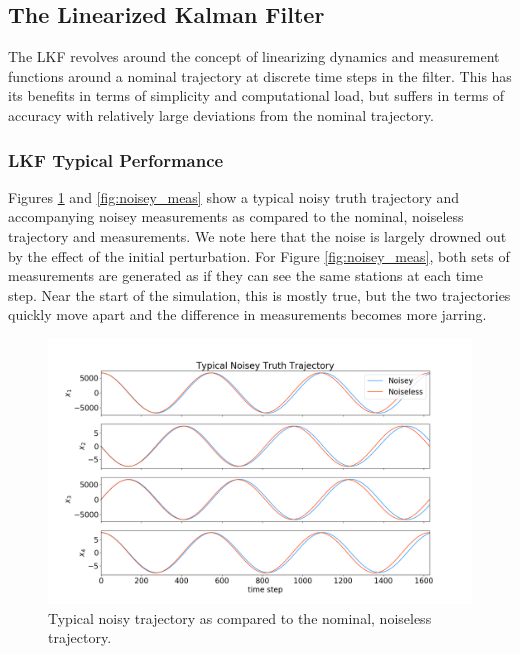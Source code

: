 \documentclass[11pt, a4paper]{article}
\begin{document}
\subsection{The Linearized Kalman Filter}
\label{sec: LKF}
The LKF revolves around the concept of linearizing dynamics and measurement functions around a nominal trajectory at discrete time steps in the filter. 
This has its benefits in terms of simplicity and computational load, but suffers in terms of accuracy with relatively large deviations from the nominal trajectory. 

\subsubsection{LKF Typical Performance}
Figures \ref{fig:noisey_states} and \ref{fig:noisey_meas} show a typical noisy truth trajectory and accompanying noisey measurements as compared to the nominal, noiseless trajectory and measurements. 
We note here that the noise is largely drowned out by the effect of the initial perturbation. 
For Figure \ref{fig:noisey_meas}, both sets of measurements are generated as if they can see the same stations at each time step. 
Near the start of the simulation, this is mostly true, but the two trajectories quickly move apart and the difference in measurements becomes more jarring.

\begin{figure}[H]
	\centering
	\includegraphics[width=\textwidth]{Figures/noisey_truth.png}
	\caption{Typical noisy trajectory as compared to the nominal, noiseless trajectory.}
	\label{fig:noisey_states}
\end{figure}
\end{document}

